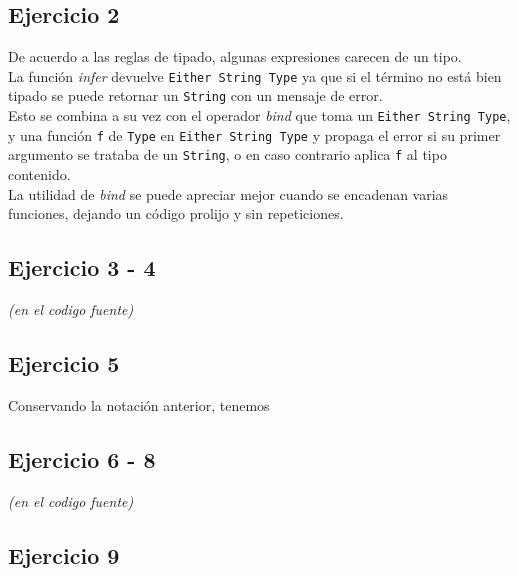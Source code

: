 \documentclass[12pt]{article}
\begin{document}
\subsection{Ejercicio 2}

De acuerdo a las reglas de tipado, algunas expresiones carecen de un tipo. \\
La función \textit{infer} devuelve \texttt{Either String Type} ya que si el término no está bien tipado se puede retornar un \texttt{String} con un mensaje de error.\\
Esto se combina a su vez con el operador \textit{bind} que toma un \texttt{Either String Type}, y una función \texttt{f} de \texttt{Type} en \texttt{Either String Type} y propaga el error si su primer argumento se trataba de un \texttt{String}, o en caso contrario aplica \texttt{f} al tipo contenido.\\
La utilidad de \textit{bind} se puede apreciar mejor cuando se encadenan varias funciones, dejando un código prolijo y sin repeticiones.

\subsection{Ejercicio 3 - 4}

\textit{(en el codigo fuente)}

\subsection{Ejercicio 5}

Conservando la notación anterior, tenemos\\


\subsection{Ejercicio 6 - 8}

\textit{(en el codigo fuente)}

\subsection{Ejercicio 9}
\end{document}
